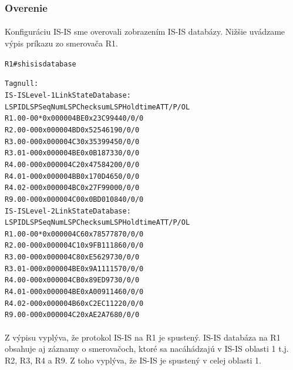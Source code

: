 \documentclass[12pt,twoside,a4paper]{report}
\begin{document}
\subsubsection{Overenie}
\paragraph{}
Konfiguráciu IS-IS sme overovali zobrazením IS-IS databázy. Nižšie uvádzame výpis príkazu  zo smerovača R1.

\noindent
{\selectfont
\begin{small}
\begin{alltt}
R1#sh isis database 

Tag null:
IS-IS Level-1 Link State Database:
LSPID                 LSP Seq Num  LSP Checksum  LSP Holdtime      ATT/P/OL
R1.00-00            * 0x000004BE   0x23C9        944               0/0/0
R2.00-00              0x000004BD   0x5254        619               0/0/0
R3.00-00              0x000004C3   0x3539        945               0/0/0
R3.01-00              0x000004BE   0x0B18        733               0/0/0
R4.00-00              0x000004C2   0x4758        420               0/0/0
R4.01-00              0x000004BB   0x170D        465               0/0/0
R4.02-00              0x000004BC   0x27F9        900               0/0/0
R9.00-00              0x000004C0   0x0BD0        1084              0/0/0
IS-IS Level-2 Link State Database:
LSPID                 LSP Seq Num  LSP Checksum  LSP Holdtime      ATT/P/OL
R1.00-00            * 0x000004C6   0x7857        787               0/0/0
R2.00-00              0x000004C1   0x9FB1        1186              0/0/0
R3.00-00              0x000004C8   0xE562        973               0/0/0
R3.01-00              0x000004BE   0x9A11        1157              0/0/0
R4.00-00              0x000004CB   0x89ED        973               0/0/0
R4.01-00              0x000004BE   0xA009        1146              0/0/0
R4.02-00              0x000004B6   0xC2EC        1122              0/0/0
R9.00-00              0x000004C2   0xAE2A        768               0/0/0
\end{alltt}
\end{small}
}


\paragraph{}
Z výpisu vyplýva, že protokol IS-IS na R1 je spustený. IS-IS databáza na R1 obsahuje aj záznamy o smerovačoch, ktoré sa nacáhádzajú v IS-IS oblasti 1 t.j. R2, R3, R4 a R9. Z toho vyplýva, že IS-IS je spustený v celej oblasti 1.
\end{document}
